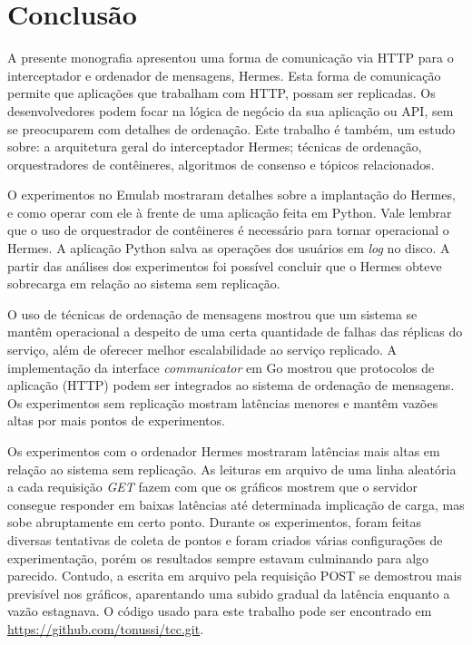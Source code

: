 \chapter{Conclusão}
\label{cap:conclusao}

A presente monografia apresentou uma forma de comunicação via HTTP para o interceptador e ordenador de mensagens, Hermes. Esta forma de comunicação permite que aplicações que trabalham com HTTP, possam ser replicadas. Os desenvolvedores podem focar na lógica de negócio da sua aplicação ou \gls{API}, sem se preocuparem com detalhes de ordenação. Este trabalho é também, um estudo sobre: a arquitetura geral do interceptador Hermes; técnicas de ordenação, orquestradores de contêineres, algoritmos de consenso e tópicos relacionados.

O experimentos no Emulab mostraram detalhes sobre a implantação do Hermes, e como operar com ele à frente de uma aplicação feita em Python. Vale lembrar que o uso de orquestrador de contêineres é necessário para tornar operacional o Hermes. A aplicação Python salva as operações dos usuários em \textit{log} no disco. A partir das análises dos experimentos foi possível concluir que o Hermes obteve sobrecarga em relação ao sistema sem replicação.

O uso de técnicas de ordenação de mensagens mostrou que um sistema se mantêm operacional a despeito de uma certa quantidade de falhas das réplicas do serviço, além de oferecer melhor escalabilidade ao serviço replicado. A implementação da interface \textit{communicator} em Go mostrou que protocolos de aplicação (\gls{HTTP}) podem ser integrados ao sistema de ordenação de mensagens. Os experimentos sem replicação mostram latências menores e mantêm vazões altas por mais pontos de experimentos.

Os experimentos com o ordenador Hermes mostraram latências mais altas em relação ao sistema sem replicação. As leituras em arquivo de uma linha aleatória a cada requisição \textit{GET} fazem com que os gráficos mostrem que o servidor consegue responder em baixas latências até determinada implicação de carga, mas sobe abruptamente em certo ponto. Durante os experimentos, foram feitas diversas tentativas de coleta de pontos e foram criados várias configurações de experimentação, porém os resultados sempre estavam culminando para algo parecido. Contudo, a escrita em arquivo pela requisição POST se demostrou mais previsível nos gráficos, aparentando uma subido gradual da latência enquanto a vazão estagnava. O código usado para este trabalho pode ser encontrado em \url{https://github.com/tonussi/tcc.git}.

